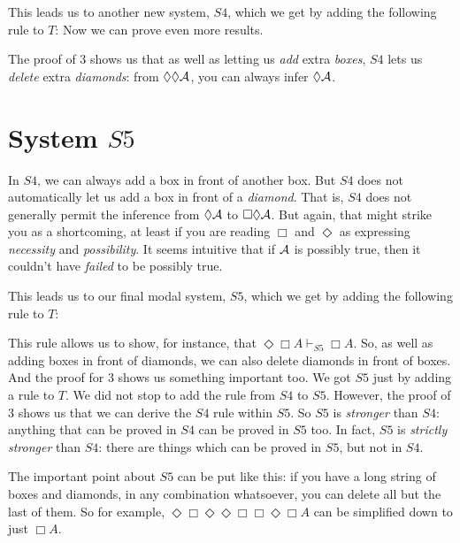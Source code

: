This leads us to another new system, $S4$, which we get by adding the following rule to $T$:
Now we can prove even more results. 

The proof of 3 shows us that as well as letting us \emph{add} extra \emph{boxes}, $S4$ lets us \emph{delete} extra \emph{diamonds}: from $\Diamond\Diamond \mathcal{A}$, you can always infer $\Diamond\mathcal{A}$.

\section{System $S5$}
\label{S5}

In $S4$, we can always add a box in front of another box. But $S4$ does not automatically let us add a box in front of a \emph{diamond}. That is, $S4$ does not generally permit the inference from $\Diamond\mathcal{A}$ to $\Box\Diamond\mathcal{A}$. But again, that might strike you as a shortcoming, at least if you are reading $\Box$ and $\Diamond$ as expressing \emph{necessity} and \emph{possibility}. It seems intuitive that if $\mathcal{A}$ is possibly true, then it couldn't have \emph{failed} to be possibly true.

This leads us to our final modal system, $S5$, which we get by adding the following rule to $T$:

This rule allows us to show, for instance, that $\Diamond\Box A\vdash_{S5}\Box A$. So, as well as adding boxes in front of diamonds, we can also delete diamonds in front of boxes. And the proof for 3 shows us something important too. We got $S5$ just by adding a rule to $T$. We did not stop to add the rule from $S4$ to $S5$. However, the proof of 3 shows us that we can derive the $S4$ rule within $S5$. So $S5$ is \emph{stronger} than $S4$: anything that can be proved in $S4$ can be proved in $S5$ too. In fact, $S5$ is \emph{strictly stronger} than $S4$: there are things which can be proved in $S5$, but not in $S4$.

The important point about $S5$ can be put like this: if you have a long string of boxes and diamonds, in any combination whatsoever, you can delete all but the last of them. So for example, $\Diamond\Box\Diamond\Diamond\Box\Box\Diamond\Box A$ can be simplified down to just $\Box A$.

